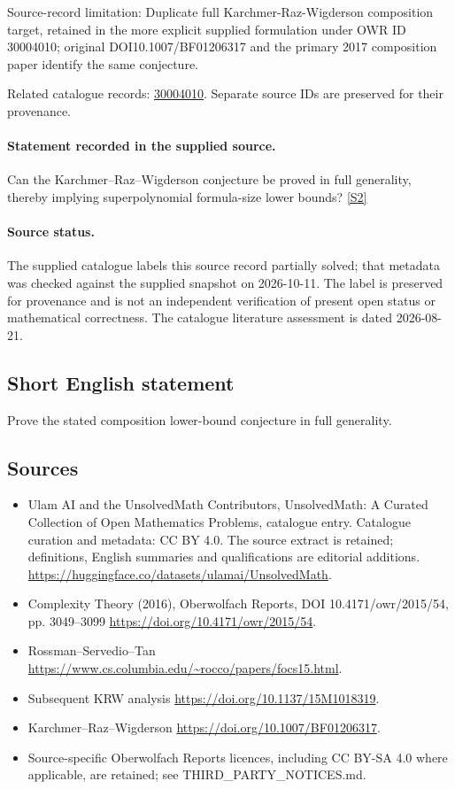 \documentclass[11pt]{article}
\begin{document}
Source-record limitation: Duplicate full Karchmer-Raz-Wigderson composition target, retained in the more explicit supplied formulation under OWR ID 30004010; original DOI10.1007/BF01206317 and the primary 2017 composition paper identify the same conjecture.

Related catalogue records: \href{https://mehmetmars7.github.io/Erdosproblems-llm-hunter/problem.html?type=open_problems&id=30004010}{30004010}. Separate source IDs are preserved for their provenance.
\paragraph{Statement recorded in the supplied source.}
Can the Karchmer–Raz–Wigderson conjecture be proved in full generality, thereby implying superpolynomial formula-size lower bounds? \href{https://doi.org/10.4171/owr/2015/54}{[S2]}
\paragraph{Source status.}
The supplied catalogue labels this source record partially solved; that metadata was checked against the supplied snapshot on 2026-10-11. The label is preserved for provenance and is not an independent verification of present open status or mathematical correctness. The catalogue literature assessment is dated 2026-08-21.
\subsection{Short English statement}
Prove the stated composition lower-bound conjecture in full generality.
\subsection{Sources}
\begin{itemize}
\item[S1] Ulam AI and the UnsolvedMath Contributors, UnsolvedMath: A Curated Collection of Open Mathematics Problems, catalogue entry. Catalogue curation and metadata: CC BY 4.0. The source extract is retained; definitions, English summaries and qualifications are editorial additions.
\url{https://huggingface.co/datasets/ulamai/UnsolvedMath}.
\item[S2] Complexity Theory (2016), Oberwolfach Reports, DOI 10.4171/owr/2015/54, pp. 3049--3099
\url{https://doi.org/10.4171/owr/2015/54}.
\item[S3] Rossman--Servedio--Tan
\url{https://www.cs.columbia.edu/~rocco/papers/focs15.html}.
\item[S4] Subsequent KRW analysis
\url{https://doi.org/10.1137/15M1018319}.
\item[S5] Karchmer--Raz--Wigderson
\url{https://doi.org/10.1007/BF01206317}.
\item Source-specific Oberwolfach Reports licences, including CC BY-SA 4.0 where applicable, are retained; see THIRD\_PARTY\_NOTICES.md.
\end{itemize}
\end{document}
